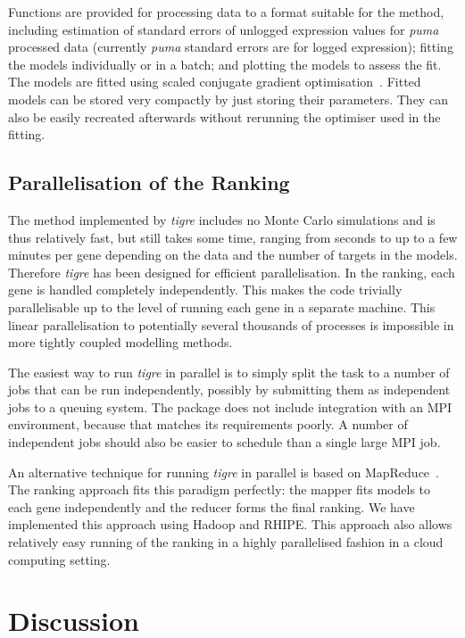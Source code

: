 \documentclass{bioinfo}
\newcommand{\tigre}{\emph{tigre}}
\begin{document}
Functions are provided for processing data to a format suitable for
the method, including estimation of standard errors of unlogged expression
values for \emph{puma} processed data (currently \emph{puma} standard errors are for logged expression); fitting the models individually
or in a batch; and plotting the models to assess the fit.  The models
are fitted using scaled conjugate gradient
optimisation~\citep{Moller:scg93}.  Fitted models can be stored very
compactly by just storing their parameters.  They can also be easily
recreated afterwards without rerunning the optimiser used in the
fitting.

\subsection{Parallelisation of the Ranking}

The method implemented by \tigre{} includes no Monte Carlo simulations
and is thus relatively fast, but still takes some time, ranging from
seconds to up to a few minutes per gene depending on the data and the
number of targets in the models.
Therefore \tigre{} has been designed for efficient parallelisation.  In the
ranking, each gene is handled completely independently.  This makes
the code trivially parallelisable up to the level of running each gene
in a separate machine.  This linear parallelisation to potentially
several thousands of processes is impossible in more tightly coupled
modelling methods.

The easiest way to run \tigre{} in parallel is to simply split the
task to a number of jobs that can be run independently, possibly by
submitting them as independent jobs to a queuing system.  The package
does not include integration with an MPI environment, because that
matches its requirements poorly.  A number of independent jobs should
also be easier to schedule than a single large MPI job.

An alternative technique for running \tigre{} in parallel is based on
MapReduce~\citep{Dean2008}.  The ranking approach fits this paradigm
perfectly: the mapper fits models to each gene independently and the
reducer forms the final ranking.  We have implemented this approach
using Hadoop and RHIPE.  This approach also allows relatively easy
running of the ranking in a highly parallelised fashion in a cloud
computing setting.

\section{Discussion}
\end{document}
